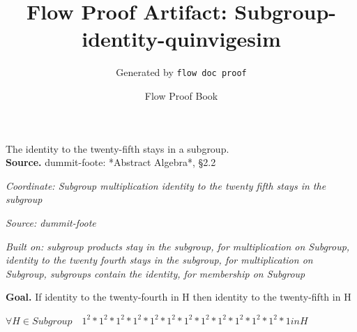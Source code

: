 \documentclass[11pt]{article}
\title{Flow Proof Artifact: Subgroup-identity-quinvigesim}
\author{Generated by \texttt{flow doc proof}}
\date{Flow Proof Book}
\theoremstyle{definition}
\begin{document}
\maketitle
The identity to the twenty-fifth stays in a subgroup.\\[0.5em]
\textbf{Source.} dummit-foote: *Abstract Algebra*, §2.2\\[0.5em]
\bigskip
{}\par
\smallskip\noindent\textit{Coordinate: Subgroup \cdot multiplication \cdot identity to the twenty fifth stays in the subgroup}\par
\smallskip\noindent\textit{Source: dummit-foote}\par
\smallskip\noindent\textit{Built on: subgroup products stay in the subgroup, for multiplication on Subgroup, identity to the twenty fourth stays in the subgroup, for multiplication on Subgroup, subgroups contain the identity, for membership on Subgroup}\par
\medskip
\noindent\textbf{Goal.} If identity to the twenty-fourth in H then identity to the twenty-fifth in H\par
\noindent$\displaystyle \forall H \in Subgroup\quad 1^{2} * 1^{2} * 1^{2} * 1^{2} * 1^{2} * 1^{2} * 1^{2} * 1^{2} * 1^{2} * 1^{2} * 1^{2} * 1^{2} * 1 in H$\par
\medskip
\noindent
\end{document}
